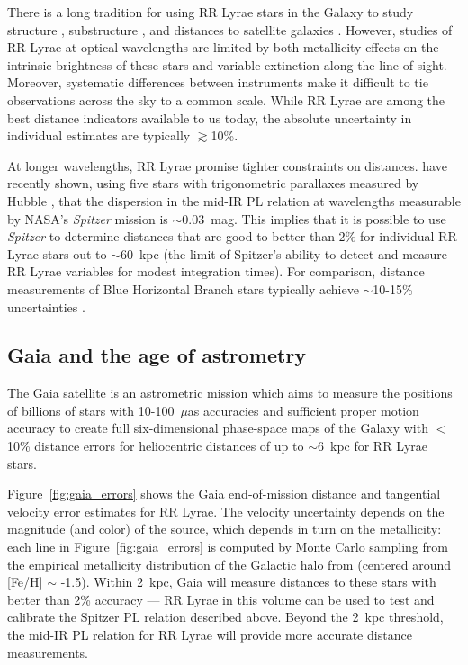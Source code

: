 \documentclass{emulateapj}
\begin{document}
There is a long tradition for using RR Lyrae stars in the Galaxy to
study structure 
\citep[e.g.][]{shapley18}, substructure
\citep[e.g.][]{sesar10}, and distances to satellite galaxies
\citep[e.g.][]{clementini03}.  However, studies of RR Lyrae at optical
wavelengths are limited by both metallicity effects on the intrinsic
brightness of these stars and variable extinction along the line of
sight.  Moreover, systematic differences between instruments make it
difficult to tie observations across the sky to a common scale. While
RR Lyrae are among the best distance indicators available to us today,
the absolute uncertainty in individual estimates are typically
$\gtrsim$10\%.

At longer wavelengths, RR Lyrae promise tighter constraints on
distances.  
\citet{madore12} have recently shown, 
using five stars with
trigonometric parallaxes measured by Hubble \citep{benedict11},
that the dispersion in the mid-IR PL relation 
\citep[first mapped by][]{longmore86}
at
wavelengths measurable by NASA's {\it Spitzer} mission is $\sim$0.03~mag.
This implies that it is
possible to use {\it Spitzer} to determine distances that are good to better
than $2\%$ for individual RR Lyrae stars out to $\sim$60~kpc (the limit of
Spitzer's ability to detect and measure RR Lyrae variables for modest
integration times). 
For comparison, distance measurements of Blue Horizontal Branch
stars typically
achieve $\sim$10-15\% uncertainties  \citep[if appropriate color measurements are available. e.g.,][]{deason12b}.


\subsection{Gaia and the age of astrometry}
\label{sec:gaia}
The Gaia satellite \citep{gaia01} is
an astrometric mission which aims to measure the positions of billions
of stars with 10-100~$\mu$as accuracies and sufficient
proper motion accuracy to create full six-dimensional phase-space maps
of the Galaxy with $<$10\% distance errors for heliocentric distances of
up to $\sim$6~kpc for RR Lyrae stars.

Figure~\ref{fig:gaia_errors} shows the Gaia end-of-mission distance
and tangential velocity error estimates for RR Lyrae. The velocity
uncertainty depends on the magnitude (and color) of the source, which depends in turn on
the metallicity: each line in Figure~\ref{fig:gaia_errors} is computed
by Monte Carlo sampling from the empirical metallicity distribution of
the Galactic halo from \cite{ivezic08} (centered around [Fe/H] $\sim$
-1.5). Within 2~kpc, Gaia will measure distances to these stars with
better than 2\% accuracy --- RR Lyrae in this volume can be used to
test and calibrate the Spitzer PL relation described above. Beyond the
2~kpc threshold, the mid-IR PL relation for RR Lyrae will provide more
accurate distance measurements.
\end{document}
